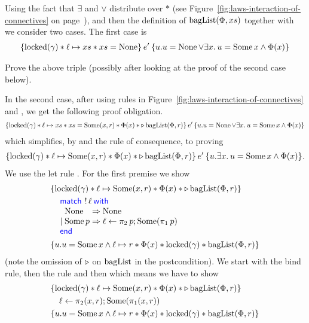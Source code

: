 \begin{example}
  Using the fact that $\exists$ and $\lor$ distribute over $\ast$ (see Figure~\ref{fig:laws-interaction-of-connectives} on page~\pageref{fig:laws-interaction-of-connectives}),  and then the definition of $\operatorname{bagList}(\Phi,xs)$ together with  we consider two cases.
  The first case is
  \begin{align*}
    \hoare{\locked(\gamma) \ast \ell \pointsto xs \ast xs = \None}{e'}{u.u = \None \lor{} \Exists x. u = \Some x \land \Phi(x)}
  \end{align*}
  \begin{exercise}
    Prove the above triple (possibly after looking at the proof of the second case below).
  \end{exercise}
  

  In the second case, after using rules in Figure~\ref{fig:laws-interaction-of-connectives} and , we get the following proof obligation.
  \begin{align*}
    \hoare{\locked(\gamma) \ast \ell \pointsto xs \ast xs = \Some(x, r) \ast \Phi(x) \ast \later \baglist(\Phi,r)}{e'}{u.u = \None \lor{} \Exists x. u = \Some x \land \Phi(x)}
  \end{align*}
  which simplifies, by  and the rule of consequence, to proving
  \begin{align*}
    \hoare{\locked(\gamma) \ast \ell \pointsto \Some(x, r) \ast \Phi(x) \ast \later \baglist(\Phi,r)}{e'}{u.\Exists x. u = \Some x \land \Phi(x)}.
  \end{align*}
  We use the let rule .
  For the first premise we show
  \begin{align*}
    \hoareV{\locked(\gamma) \ast \ell \pointsto \Some(x, r) \ast \Phi(x) \ast \later \baglist(\Phi,r)}{\MatchML{\deref \ell}with{\None}=>{\None}|{\Some p}=>{\ell \gets \Proj{2}{p} ; \Some (\Proj{1}{p})}end{}}{u.u = \Some x \land \ell \pointsto r \ast \Phi(x) \ast \locked(\gamma) \ast \baglist(\Phi,r)}
  \end{align*}
  (note the omission of $\mathop{{\triangleright}}$ on $\operatorname{bagList}$ in the postcondition).
  We start with the bind rule, then the  rule and then  which means we have to show
  \begin{align*}
    \hoareV{\locked(\gamma) \ast \ell \pointsto \Some(x, r) \ast \Phi(x) \ast \later \baglist(\Phi,r)}{\ell \gets \pi_2(x, r) ; \Some(\pi_1 (x,r))}{u.u = \Some x \land \ell \pointsto r \ast \Phi(x) \ast \locked(\gamma) \ast \baglist(\Phi,r)}
  \end{align*}

\end{example}
